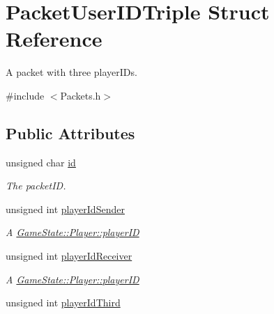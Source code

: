 \hypertarget{struct_packet_user_i_d_triple}{\section{Packet\-User\-I\-D\-Triple Struct Reference}
\label{struct_packet_user_i_d_triple}
}


A packet with three player\-I\-Ds.  




{\ttfamily \#include $<$Packets.\-h$>$}

\subsection*{Public Attributes}
\begin{DoxyCompactItemize}
\item 
\hypertarget{struct_packet_user_i_d_triple_a0b1062f754fdd84e60c3cb4eec5fb83b}{unsigned char \hyperlink{struct_packet_user_i_d_triple_a0b1062f754fdd84e60c3cb4eec5fb83b}{id}}\label{struct_packet_user_i_d_triple_a0b1062f754fdd84e60c3cb4eec5fb83b}

\begin{DoxyCompactList}\small\item\em The packet\-I\-D. \end{DoxyCompactList}\item 
\hypertarget{struct_packet_user_i_d_triple_a2150148f417662b9c0b8987ac8e57ef6}{unsigned int \hyperlink{struct_packet_user_i_d_triple_a2150148f417662b9c0b8987ac8e57ef6}{player\-Id\-Sender}}\label{struct_packet_user_i_d_triple_a2150148f417662b9c0b8987ac8e57ef6}

\begin{DoxyCompactList}\small\item\em A \hyperlink{class_game_state_1_1_player_acbd28d89e6eb8611aa66452ec31e9133}{Game\-State\-::\-Player\-::player\-I\-D} \end{DoxyCompactList}\item 
\hypertarget{struct_packet_user_i_d_triple_a1181a138b9ab0d5ee33dc3f2c33171a4}{unsigned int \hyperlink{struct_packet_user_i_d_triple_a1181a138b9ab0d5ee33dc3f2c33171a4}{player\-Id\-Receiver}}\label{struct_packet_user_i_d_triple_a1181a138b9ab0d5ee33dc3f2c33171a4}

\begin{DoxyCompactList}\small\item\em A \hyperlink{class_game_state_1_1_player_acbd28d89e6eb8611aa66452ec31e9133}{Game\-State\-::\-Player\-::player\-I\-D} \end{DoxyCompactList}\item 
\hypertarget{struct_packet_user_i_d_triple_adc0ab416d757528e3d3b0fcf59414e97}{unsigned int \hyperlink{struct_packet_user_i_d_triple_adc0ab416d757528e3d3b0fcf59414e97}{player\-Id\-Third}}\label{struct_packet_user_i_d_triple_adc0ab416d757528e3d3b0fcf59414e97}


\end{DoxyCompactItemize}
